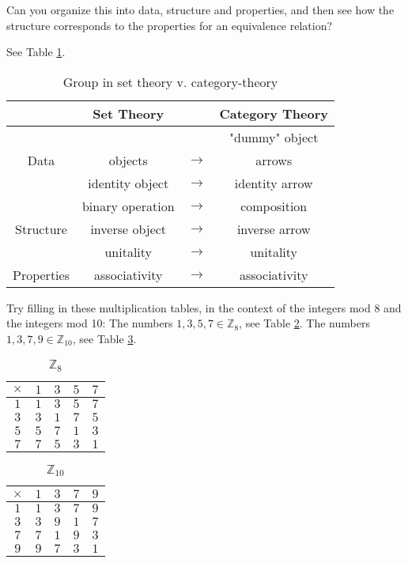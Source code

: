 \begin{ttta}
Can you organize this into data, structure and properties, and then see
how the structure corresponds to the properties for an equivalence relation?
\end{ttta}
See Table \ref{tbl:group}.
\begin{table}
    \centering
    \begin{tabular}{ c|ccc }
    \hline
    & Set Theory & & Category Theory \\ \hline
    & & & "dummy" object \\
    Data & objects & $\rightarrow$ & arrows \\ \hline
    & identity object & $\rightarrow$ & identity arrow \\
    & binary operation & $\rightarrow$ & composition \\
    Structure & inverse object & $\rightarrow$ & inverse arrow \\ \hline
    & unitality & $\rightarrow$ & unitality \\
    Properties & associativity& $\rightarrow$ & associativity
    \\\hline
    \end{tabular}
    \caption{Group in set theory v. category-theory}
    \label{tbl:group}
\end{table}
\begin{ttta}
Try filling in these multiplication tables, in the context of the integers
mod 8 and the integers mod 10:
The numbers $1, 3, 5, 7\in \mathbb{Z}_8$, see Table \ref{tbl:z8}.
The numbers $1, 3, 7, 9\in \mathbb{Z}_{10}$, see Table \ref{tbl:z10}.
\end{ttta}
\begin{table}
\centering
\begin{tabular}{c|cccc}
 $\times $ & $1$ & $3$ & $5$ & $7$ \\
 \hline
 $1$ & $1$ & $3$ & $5$ & $7$ \\
 $3$ & $3$ & $1$ & $7$ & $5$ \\
 $5$ & $5$ & $7$ & $1$ & $3$ \\
 $7$ & $7$ & $5$ & $3$ & $1$ \\
\end{tabular}
\caption{$\mathbb{Z}_8$}
\label{tbl:z8}
\end{table}
\begin{table}
\centering
\begin{tabular}{c|cccc}
 $\times $ & $1$ & $3$ & $7$ & $9$ \\
 \hline
 $1$ & $1$ & $3$ & $7$ & $9$ \\
 $3$ & $3$ & $9$ & $1$ & $7$ \\
 $7$ & $7$ & $1$ & $9$ & $3$ \\
 $9$ & $9$ & $7$ & $3$ & $1$ \\
\end{tabular}
\caption{$\mathbb{Z}_{10}$}
\label{tbl:z10}
\end{table}

